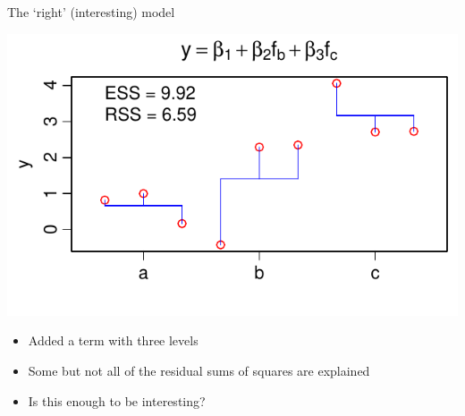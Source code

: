 \documentclass[xcolor=x11names,handout,compress]{beamer}
\renewcommand{\(}{\begin{columns}}
\renewcommand{\)}{\end{columns}}
\newcommand{\<}[1]{\begin{column}{#1}}
\renewcommand{\>}{\end{column}}
\begin{document}
\begin{frame}{The `right' (interesting) model}

    \centerline{\includegraphics[height=0.5\textheight]{Intermediate.pdf}}

    \begin{itemize}\itemsep6pt
    \item Added a term with three levels
    \item Some but not all of the residual sums of squares are explained
    \item Is this enough to be interesting?
    \end{itemize}		

\end{frame}
\end{document}
